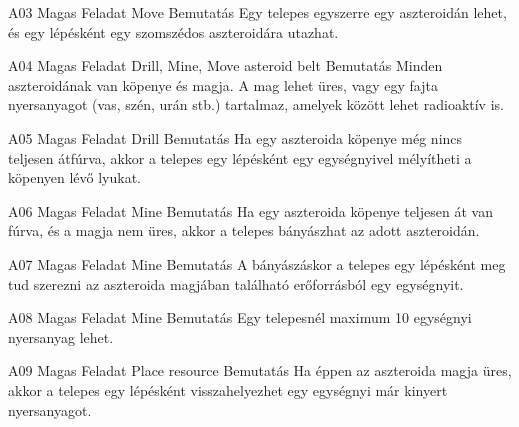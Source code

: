 \documentclass[../../projlab]{subfiles}
\begin{document}
\begin{funkovetelmeny}
	{A03}
	{Magas}
	{Feladat}
	{Move}
	{Bemutatás}
	{Egy telepes egyszerre egy aszteroidán lehet, és egy lépésként egy szomszédos aszteroidára utazhat.}
    
\end{funkovetelmeny}

\begin{funkovetelmeny}
	{A04}
	{Magas}
	{Feladat}
	{Drill, Mine, Move asteroid belt}
	{Bemutatás}
	{Minden aszteroidának van köpenye és magja. A mag lehet üres, vagy egy fajta nyersanyagot (vas, szén, urán stb.) tartalmaz, amelyek között lehet radioaktív is.}
    
\end{funkovetelmeny}

\begin{funkovetelmeny}
	{A05}
	{Magas}
	{Feladat}
	{Drill}
	{Bemutatás}
	{Ha egy aszteroida köpenye még nincs teljesen átfúrva, akkor a telepes egy lépésként egy egységnyivel mélyítheti a köpenyen lévő lyukat.}
    
\end{funkovetelmeny}

\begin{funkovetelmeny}
	{A06}
	{Magas}
	{Feladat}
	{Mine}
	{Bemutatás}
	{Ha egy aszteroida köpenye teljesen át van fúrva, és a magja nem üres, akkor a telepes bányászhat az adott aszteroidán.}
    
\end{funkovetelmeny}

\begin{funkovetelmeny}
	{A07}
	{Magas}
	{Feladat}
	{Mine}
	{Bemutatás}
	{A bányászáskor a telepes egy lépésként meg tud szerezni az aszteroida magjában található erőforrásból egy egységnyit. }
    
\end{funkovetelmeny}

\begin{funkovetelmeny}
	{A08}
	{Magas}
	{Feladat}
	{Mine}
	{Bemutatás}
	{Egy telepesnél maximum 10 egységnyi nyersanyag lehet. }
    
\end{funkovetelmeny}

\begin{funkovetelmeny}
	{A09}
	{Magas}
	{Feladat}
	{Place resource}
	{Bemutatás}
	{Ha éppen az aszteroida magja üres, akkor a telepes egy lépésként visszahelyezhet egy egységnyi már kinyert nyersanyagot.}
    
\end{funkovetelmeny}
\end{document}

